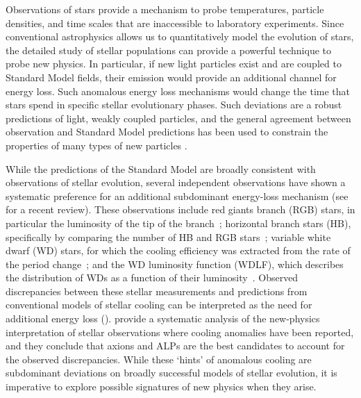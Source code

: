 
Observations of stars provide a mechanism to probe temperatures, particle densities, and time scales that are inaccessible to laboratory experiments.
Since conventional astrophysics allows us to quantitatively model the evolution of stars, the detailed study of stellar populations can provide a powerful technique to probe new physics.
In particular, if new light particles exist and are coupled to Standard Model fields, their emission would provide an additional channel for energy loss. 
Such anomalous energy loss mechanisms would change the time that stars spend in specific stellar evolutionary phases.
Such deviations are a robust predictions of light, weakly coupled particles, and the general agreement between observation and Standard Model predictions has been used to constrain the properties of many types of new particles \citep{hep-ph/0611350, 1210.1271, 1302.3884, 1305.2920, 1611.03864, 1611.05852, 1803.00993}.

While the predictions of the Standard Model are broadly consistent with observations of stellar evolution, several independent observations have shown a systematic preference for an additional subdominant energy-loss mechanism (see \citealt{Giannotti:2017hny} for a recent review).
These observations include red giants branch (RGB) stars, in particular the luminosity of the tip of the branch~\citep{Viaux:2013lha,Viaux:2013hca}; 
horizontal branch stars (HB), specifically by comparing the number of HB and RGB stars~\citep{Ayala:2014,Straniero:2015nvc};
variable white dwarf (WD) stars, for which the cooling efficiency was extracted from the rate of the period change~\citep{KeplerEtAl,Isern:1992gia,BischoffKim:2007ve,Corsico:2012ki,Corsico:2012sh,Corsico:2014mpa,Corsico:2016okh,Battich:2016htm}; 
and the WD luminosity function (WDLF), which describes the distribution of WDs as a function of their luminosity~\citep{Isern:2008nt,Bertolami:2014wua,Isern:2018uce}.
Observed discrepancies between these stellar measurements and predictions from conventional models of stellar cooling can be interpreted as the need for additional energy loss ().
\cite{Giannotti:2015kwo} provide a systematic analysis of the new-physics interpretation of stellar observations  where cooling anomalies have been reported, and they conclude that axions and ALPs are the best candidates to account for the observed discrepancies. 
While these `hints' of anomalous cooling are subdominant deviations on broadly successful models of stellar evolution, it is imperative to explore possible signatures of new physics when they arise.

